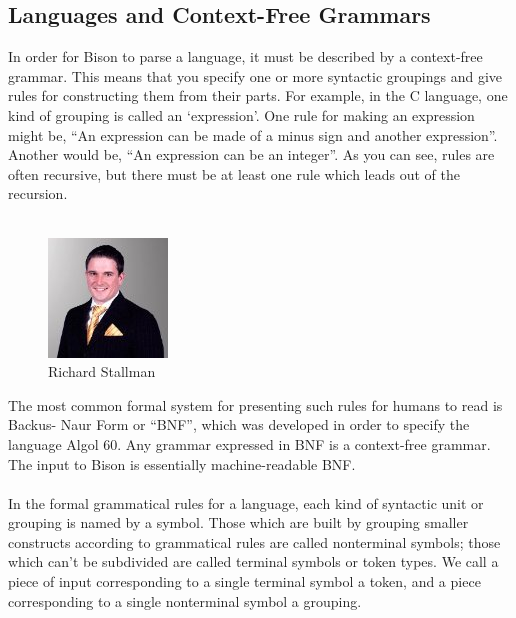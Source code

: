 \subsection{Languages and Context-Free Grammars}
In order for Bison to parse a language, it must be described by a context-free grammar.
This means that you specify one or more syntactic groupings and give rules for constructing
them from their parts. For example, in the C language, one kind of grouping is called an
‘expression’. One rule for making an expression might be, “An expression can be made of a
minus sign and another expression”. Another would be, “An expression can be an integer”.
As you can see, rules are often recursive, but there must be at least one rule which leads
out of the recursion.\\\\
\begin{figure} [h]
\centering
\includegraphics[scale=1.5]{images/bisondev.jpg}
\caption{Richard Stallman}
\end{figure}
The most common formal system for presenting such rules for humans to read is Backus-
Naur Form or “BNF”, which was developed in order to specify the language Algol 60. Any
grammar expressed in BNF is a context-free grammar. The input to Bison is essentially
machine-readable BNF.\\\\
In the formal grammatical rules for a language, each kind of syntactic unit or grouping
is named by a symbol. Those which are built by grouping smaller constructs according
to grammatical rules are called nonterminal symbols; those which can’t be subdivided
are called terminal symbols or token types. We call a piece of input corresponding to a
single terminal symbol a token, and a piece corresponding to a single nonterminal symbol
a grouping.\\\\


